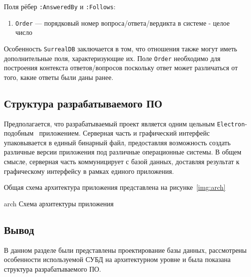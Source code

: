 Поля рёбер \texttt{:AnsweredBy} и \texttt{:Follows}:
\begin{enumerate}
    \item \texttt{Order} --- порядковый номер вопроса/ответа/вердикта в системе - целое число
\end{enumerate}


Особенность \texttt{SurrealDB} заключается в том, что отношения также могут иметь дополнительные поля, характеризующие их.
Поле \texttt{Order} необходимо для построения контекста ответов/вопросов поскольку ответ может различаться от того, какие ответы были даны ранее.

\subsection{Структура разрабатываемого ПО}
Предполагается, что разрабатываемый проект является одним цельным \texttt{Electron}-подобным~\cite{electron} приложением.
Серверная часть и графический интерфейс упаковывается в единый бинарный файл, предоставляя возможность создать различные версии приложения под различные операционные системы.
В общем смысле, серверная часть коммуницирует с базой данных, доставляя результат к графическому интерфейсу в рамках единого приложения.

Общая схема архитектура приложения представлена на рисунке~\ref{img:arch}

\img{75mm}
{arch}
{Схема архитектуры приложения}


\subsection*{Вывод}
В данном разделе были представлены проектирование базы данных, рассмотрены особенности используемой СУБД на архитектурном уровне и была показана структура разрабатываемого ПО.
